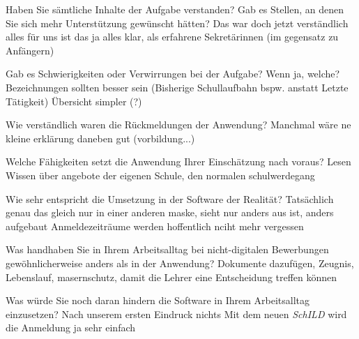 Haben Sie sämtliche Inhalte der Aufgabe verstanden? Gab es Stellen, an denen Sie sich mehr Unterstützung gewünscht hätten?	
Das war doch jetzt verständlich alles
für uns ist das ja alles klar, als erfahrene Sekretärinnen
(im gegensatz zu Anfängern)

Gab es Schwierigkeiten oder Verwirrungen bei der Aufgabe? Wenn ja, welche?
Bezeichnungen sollten besser sein (Bisherige Schullaufbahn bspw. anstatt Letzte Tätigkeit)
Übersicht simpler (?)












Wie verständlich waren die Rückmeldungen der Anwendung?		
Manchmal wäre ne kleine erklärung daneben gut (vorbildung...)				










Welche Fähigkeiten setzt die Anwendung Ihrer Einschätzung nach voraus?
Lesen
Wissen über angebote der eigenen Schule, den normalen schulwerdegang

Wie sehr entspricht die Umsetzung in der Software der Realität? 	
Tatsächlich genau das gleich nur in einer anderen maske, 
sieht nur anders aus ist, anders aufgebaut
Anmeldezeiträume werden hoffentlich nciht mehr vergessen	











Was handhaben Sie in Ihrem Arbeitsalltag bei nicht-digitalen Bewerbungen gewöhnlicherweise anders als in der Anwendung?
Dokumente dazufügen, Zeugnis, Lebenslauf, masernschutz, damit die Lehrer eine Entscheidung treffen können


















Was würde Sie noch daran hindern die Software in Ihrem Arbeitsalltag einzusetzen?
Nach unserem ersten Eindruck nichts
Mit dem neuen \textit{SchILD} wird die Anmeldung ja sehr einfach


















